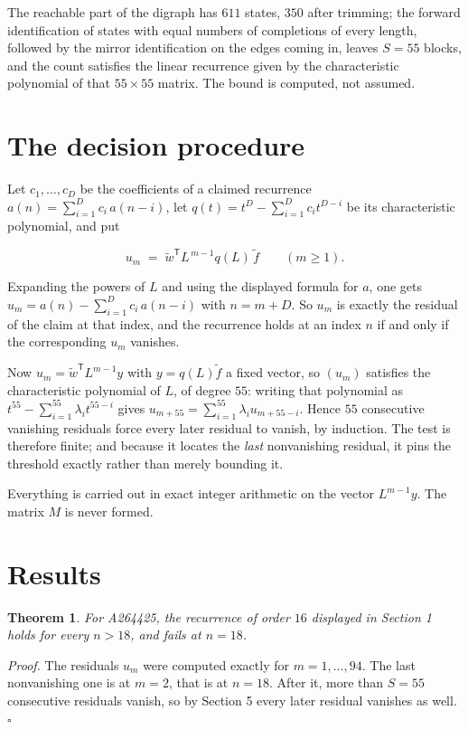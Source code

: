 \documentclass[11pt]{article}
\newtheorem{theorem}{Theorem}
\theoremstyle{definition}
\begin{document}
The reachable part of the digraph has $611$ states, $350$ after trimming; the forward identification of states with equal numbers of completions of every length, followed by the mirror identification on the edges coming in, leaves $S = 55$ blocks, and the count satisfies the linear recurrence given by the characteristic polynomial of that $55\times55$ matrix. The bound is computed, not assumed.

\section{The decision procedure}

Let $c_1,\dots,c_D$ be the coefficients of a claimed recurrence $a(n) = \sum_{i=1}^{D} c_i\,a(n-i)$, let $q(t) = t^{D} - \sum_{i=1}^{D} c_i t^{D-i}$ be its characteristic polynomial, and put

\[u_m \;=\; \tilde w^{\mathsf T} L^{\,m-1} q(L)\,\tilde f \qquad (m \ge 1).\]

Expanding the powers of $L$ and using the displayed formula for $a$, one gets $u_m = a(n) - \sum_{i=1}^{D} c_i\,a(n-i)$ with $n = m + D$. So $u_m$ is exactly the residual of the claim at that index, and the recurrence holds at an index $n$ if and only if the corresponding $u_m$ vanishes.

Now $u_m = \tilde w^{\mathsf T} L^{m-1} y$ with $y = q(L)\tilde f$ a fixed vector, so $(u_m)$ satisfies the characteristic polynomial of $L$, of degree $55$: writing that polynomial as $t^{55} - \sum_{i=1}^{55} \lambda_i t^{55-i}$ gives $u_{m+55} = \sum_{i=1}^{55} \lambda_i u_{m+55-i}$. Hence $55$ consecutive vanishing residuals force every later residual to vanish, by induction. The test is therefore finite; and because it locates the {\itshape last} nonvanishing residual, it pins the threshold exactly rather than merely bounding it.

Everything is carried out in exact integer arithmetic on the vector $L^{m-1}y$. The matrix $M$ is never formed.

\section{Results}

\begin{theorem} For A264425, the recurrence of order $16$ displayed in Section 1 holds for every $n > 18$, and fails at $n = 18$.\end{theorem}

{\itshape Proof.} The residuals $u_m$ were computed exactly for $m = 1,\dots,94$. The last nonvanishing one is at $m = 2$, that is at $n = 18$. After it, more than $S = 55$ consecutive residuals vanish, so by Section 5 every later residual vanishes as well. $\square$
\end{document}
